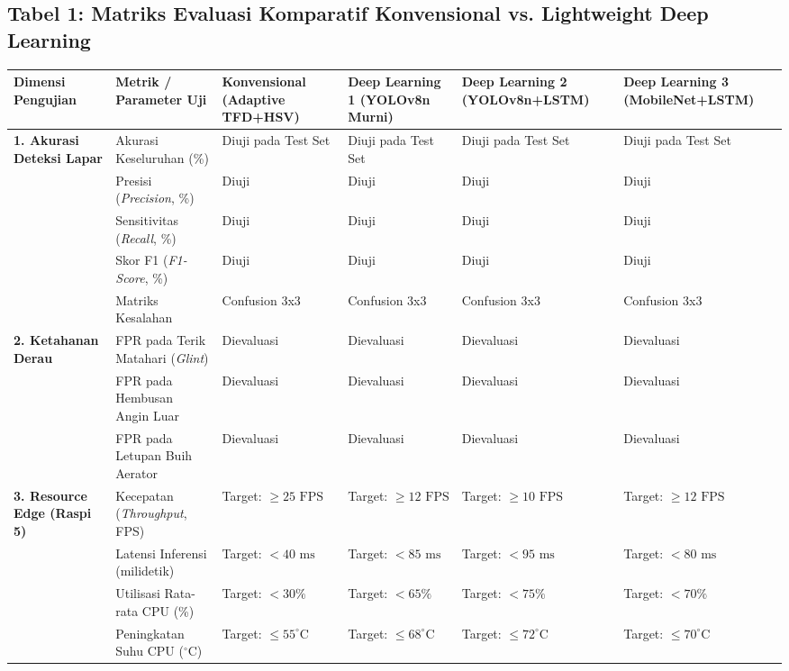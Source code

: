 \documentclass[10pt,a4paper]{article}
\providecommand{\text}[1]{\mbox{#1}}
\begin{document}
\subsection*{Tabel 1: Matriks Evaluasi Komparatif Konvensional vs. Lightweight Deep Learning}
\vspace{-0.2cm}
{\footnotesize
\setlength{\tabcolsep}{3pt}
\begin{center}
\begin{tabular}{|p{3.8cm}|p{4.2cm}|p{2.6cm}|p{2.4cm}|p{2.4cm}|p{2.4cm}|}
\hline
\textbf{Dimensi Pengujian} & \textbf{Metrik / Parameter Uji} & \textbf{Konvensional (Adaptive TFD+HSV)} & \textbf{Deep Learning 1 (YOLOv8n Murni)} & \textbf{Deep Learning 2 (YOLOv8n+LSTM)} & \textbf{Deep Learning 3 (MobileNet+LSTM)} \\
\hline
\multirow{4}{*}{\textbf{1. Akurasi Deteksi Lapar}} 
 & Akurasi Keseluruhan (\%) & Diuji pada Test Set & Diuji pada Test Set & Diuji pada Test Set & Diuji pada Test Set \\
 & Presisi (\textit{Precision}, \%) & Diuji & Diuji & Diuji & Diuji \\
 & Sensitivitas (\textit{Recall}, \%) & Diuji & Diuji & Diuji & Diuji \\
 & Skor F1 (\textit{F1-Score}, \%) & Diuji & Diuji & Diuji & Diuji \\
 & Matriks Kesalahan & Confusion 3x3 & Confusion 3x3 & Confusion 3x3 & Confusion 3x3 \\
\hline
\multirow{3}{*}{\textbf{2. Ketahanan Derau}} 
 & FPR pada Terik Matahari (\textit{Glint}) & Dievaluasi & Dievaluasi & Dievaluasi & Dievaluasi \\
 & FPR pada Hembusan Angin Luar & Dievaluasi & Dievaluasi & Dievaluasi & Dievaluasi \\
 & FPR pada Letupan Buih Aerator & Dievaluasi & Dievaluasi & Dievaluasi & Dievaluasi \\
\hline
\multirow{5}{*}{\textbf{3. Resource Edge (Raspi 5)}} 
 & Kecepatan (\textit{Throughput}, FPS) & Target: $\ge 25\text{ FPS}$ & Target: $\ge 12\text{ FPS}$ & Target: $\ge 10\text{ FPS}$ & Target: $\ge 12\text{ FPS}$ \\
 & Latensi Inferensi (milidetik) & Target: $< 40\text{ ms}$ & Target: $< 85\text{ ms}$ & Target: $< 95\text{ ms}$ & Target: $< 80\text{ ms}$ \\
 & Utilisasi Rata-rata CPU (\%) & Target: $< 30\%$ & Target: $< 65\%$ & Target: $< 75\%$ & Target: $< 70\%$ \\
 & Peningkatan Suhu CPU ($^\circ\text{C}$) & Target: $\le 55^\circ\text{C}$ & Target: $\le 68^\circ\text{C}$ & Target: $\le 72^\circ\text{C}$ & Target: $\le 70^\circ\text{C}$ \\

\end{tabular}
\end{center}}
\end{document}
